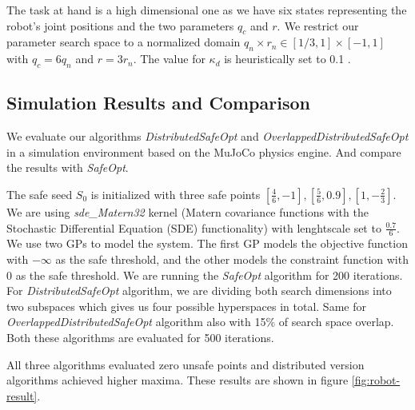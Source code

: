 The task at hand is a high dimensional one as we have six states representing the robot's joint positions and the two parameters $q_c$ and $r$.\textcolor{white}{"}We restrict our parameter search space to a normalized domain $q_n \times r_n \in [1/3,1] \times [-1,1]$ with $q_c = 6q_n$ and $r = 3r_n$. The value for $\kappa_d$ is heuristically set to 0.1 \cite{gosafeopt}.\textcolor{white}{"}

\subsection{Simulation Results and Comparison}
We evaluate our algorithms \textit{DistributedSafeOpt} and \textit{OverlappedDistributedSafeOpt} in a simulation environment based on the MuJoCo physics engine. And compare the results with \textit{SafeOpt}. 

The safe seed $S_0$ is initialized with three safe points $[\frac{4}{6},-1],[\frac{5}{6},0.9],[1,-\frac{2}{3}]$. We are using \textit{sde\_Matern32} kernel (Matern covariance functions with the Stochastic Differential Equation (SDE) functionality) with lenghtscale set to $\frac{0.7}{6}$.
We use two GPs to model the system. The first GP models the objective function with $-\infty$ as the safe threshold, and the other models the constraint function with 0 as the safe threshold.
We are running the \textit{SafeOpt} algorithm for 200 iterations. For \textit{DistributedSafeOpt} algorithm, we are dividing both search dimensions into two subspaces which gives us four possible hyperspaces in total. Same for \textit{OverlappedDistributedSafeOpt} algorithm also with 15\% of search space overlap. Both these algorithms are evaluated for 500 iterations.

All three algorithms evaluated zero unsafe points and distributed version algorithms achieved higher maxima. These results are shown in figure \ref{fig:robot-result}.

